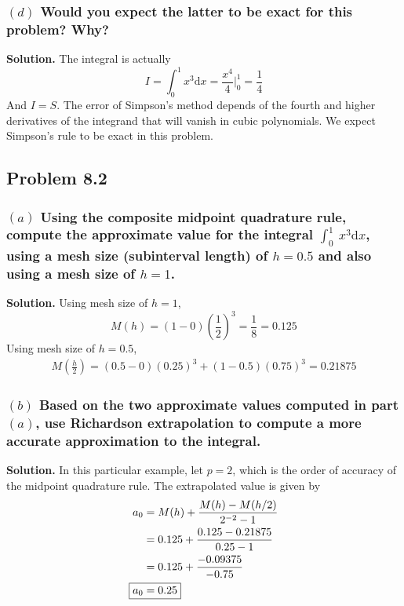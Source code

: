 \subsubsection*{$(d)$ Would you expect the latter to be exact for this problem? Why?}
\textbf{Solution.} The integral is actually
\begin{equation*}
I = \int_{0}^{1} x^3 \mathrm{d}x = \frac{x^4}{4} \Big|_0^1 = \boxed{\frac{1}{4}}
\end{equation*}
And $I=S$. The error of Simpson's method depends of the fourth and higher derivatives of the integrand that will vanish in cubic polynomials. We expect Simpson's rule to be exact in this problem.

\subsection{Problem 8.2}
\subsubsection*{$(a)$ Using the composite midpoint quadrature rule, compute the approximate value for the integral $\int_{0}^{1}\:x^3 \mathrm{d}x$, using a mesh size (subinterval length) of $h = 0.5$ and also using a mesh size of $h=1$.}
\textbf{Solution.} Using mesh size of $h=1$,
\begin{equation*}
M(h) = \left(1-0\right)\left(\frac{1}{2}\right)^3 = \frac{1}{8}  = \boxed{0.125}
\end{equation*}
Using mesh size of $h=0.5$,
\begin{align*}
M\left(\frac{h}{2}\right) = \left(0.5-0\right)\left(0.25\right)^3 + \left(1-0.5\right)\left(0.75\right)^3 = \boxed{0.21875}
\end{align*}

\subsubsection*{$(b)$ Based on the two approximate values computed  in part $(a)$, use Richardson extrapolation to compute a more  accurate approximation to the integral.}
\textbf{Solution.} In this particular example, let $p = 2$, which is the order of accuracy of the midpoint quadrature rule. The extrapolated value is given by
\begin{align*}
a_0 &= M(h) + \frac{M(h)-M(h/2)}{2^{-2}-1}\\
&= 0.125 + \frac{0.125 - 0.21875}{0.25-1}\\
&= 0.125 + \frac{-0.09375}{-0.75}\\
\Aboxed{a_0 &= 0.25}
\end{align*}

